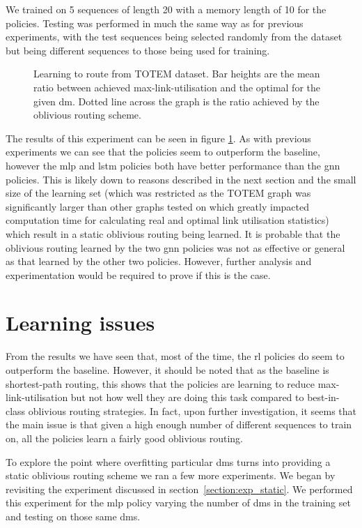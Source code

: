 We trained on 5 sequences of length 20 with a memory length of 10 for the policies. Testing was performed in much the same way as for previous experiments, with the test sequences being selected randomly from the dataset but being different sequences to those being used for training.

\begin{figure}
    \centering
    
    \caption{Learning to route from TOTEM dataset. Bar heights are the mean ratio between achieved max-link-utilisation and the optimal for the given \ac{dm}. Dotted line across the graph is the ratio achieved by the oblivious routing scheme.}
    \label{fig:exp_real}
\end{figure}

The results of this experiment can be seen in figure \ref{fig:exp_real}. As with previous experiments we can see that the policies seem to outperform the baseline, however the \ac{mlp} and \ac{lstm} policies both have better performance than the \ac{gnn} policies. This is likely down to reasons described in the next section and the small size of the learning set (which was restricted as the TOTEM graph was significantly larger than other graphs tested on which greatly impacted computation time for calculating real and optimal link utilisation statistics) which result in a static oblivious routing being learned. It is probable that the oblivious routing learned by the two \ac{gnn} policies was not as effective or general as that learned by the other two policies. However, further analysis and experimentation would be required to prove if this is the case.


\section{Learning issues}
\label{section:overfit}
From the results we have seen that, most of the time, the \ac{rl} policies do seem to outperform the baseline. However, it should be noted that as the baseline is shortest-path routing, this shows that the policies are learning to reduce max-link-utilisation but not how well they are doing this task compared to best-in-class oblivious routing strategies. In fact, upon further investigation, it seems that the main issue is that given a high enough number of different sequences to train on, all the policies learn a fairly good oblivious routing.

To explore the point where overfitting particular \acp{dm} turns into providing a static oblivious routing scheme we ran a few more experiments. We began by revisiting the experiment discussed in section~\ref{section:exp_static}. We performed this experiment for the \ac{mlp} policy varying the number of \acp{dm} in the training set and testing on those same \acp{dm}.

